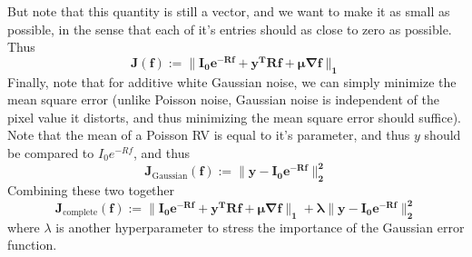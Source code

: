\documentclass[a4paper,14pt]{article}
\numberwithin{definition}{section}
\numberwithin{mytheorem}{subsection}
\begin{document}
But note that this quantity is still a vector, and we want to make it as small as possible, in the sense that each of it's entries should as close to zero as possible. Thus
$$\boldsymbol{J(f) := \lVert I_0e^{-Rf} + y^TRf + \mu\nabla f\rVert_1}$$
Finally, note that for additive white Gaussian noise, we can simply minimize the mean square error (unlike Poisson noise, Gaussian noise is independent of the pixel value it distorts, and thus minimizing the mean square error should suffice). Note that the mean of a Poisson RV is equal to it's parameter, and thus $y$ should be compared to $I_0e^{-Rf}$, and thus 
$$\boldsymbol{J_{\mathrm{Gaussian}}(f) := \lVert y - I_0e^{-Rf}\rVert^2_2}$$
Combining these two together
$$\boldsymbol{J_{\mathrm{complete}}(f) := \lVert I_0e^{-Rf} + y^TRf + \mu\nabla f\rVert_1 + \lambda\lVert y - I_0e^{-Rf}\rVert^2_2}$$
where $\lambda$ is another hyperparameter to stress the importance of the Gaussian error function.
\end{document}
